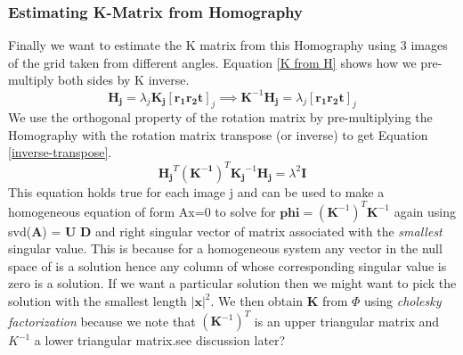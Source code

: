 \documentclass[titlepage]{article}
\begin{document}
\subsubsection{Estimating K-Matrix from Homography}
\label{estK}
Finally we want to estimate the K matrix from this Homography using 3 images of the grid taken from different angles. Equation \ref{K from H} shows how we pre-multiply both sides by K inverse.
\begin{equation}
    \label{K from H}
    \mathbf{H_j} = \lambda_j \mathbf{K_j} [\mathbf{r_1} \mathbf{r_2} \mathbf{t}]_j \implies \mathbf{K}^{-1} \mathbf{H_j} = \lambda_j [\mathbf{r_1} \mathbf{r_2} \mathbf{t}]_j
    \end{equation}
We use the orthogonal property of the rotation matrix by pre-multiplying the Homography with the rotation matrix transpose (or inverse) to get Equation \ref{inverse-transpose}.
    \begin{equation}
    \label{inverse-transpose}
        \mathbf{H_j}^T (\mathbf{K^{-1}})^{T} \mathbf{K_j}^{-1} \mathbf{H_j} = \lambda^2 \mathbf{I}
    \end{equation}
This equation holds true for each image j and can be used to make a homogeneous equation of form Ax=0 to solve for ${\mathbf{phi}} = (\mathbf{K}^{-1})^T \mathbf{K}^{-1}$ again using svd(\textbf{A}) = \textbf{U} \textbf{D}  and right singular vector of matrix \mathbf{$\phi$} associated with the \textit{smallest} singular value. This is because for a homogeneous system any vector  in the null space of  is a solution hence any column of  whose corresponding singular value is zero is a solution. If we want a particular solution then we might want to pick the solution  with the smallest length $|\mathbf{x}|^2$. We then obtain \textbf{K} from $\Phi$ using \textit{cholesky factorization} because we note that $(\mathbf{K}^{-1})^T$ is an upper triangular matrix and $K^{-1}$ a lower triangular matrix.{see discussion later?}
\end{document}
